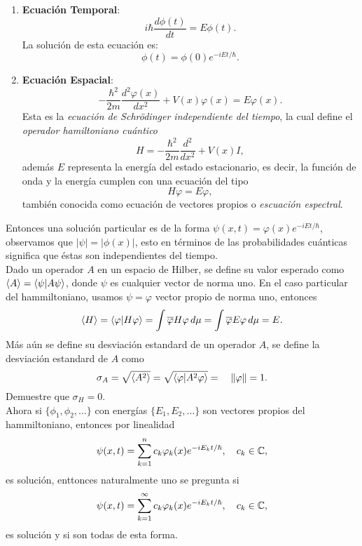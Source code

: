 \documentclass[main.tex]{subfiles}
\begin{document}
\begin{enumerate}
    \item \textbf{Ecuación Temporal}:
    \[
    i\hbar \frac{d \phi(t)}{dt} = E \phi(t).
    \]
    La solución de esta ecuación es:
    \[
    \phi(t) = \phi(0) e^{-iEt/\hbar}.
    \]

    \item \textbf{Ecuación Espacial}:
    \[
    -\frac{\hbar^2}{2m} \frac{d^2 \varphi(x)}{dx^2} + V(x) \varphi(x) = E \varphi(x).
    \]
    Esta es la \emph{ecuación de Schrödinger independiente del tiempo}, la cual define el \emph{operador hamiltoniano cuántico}
    \[
    H =-\frac{\hbar^2}{2m} \frac{d^2 }{dx^2} + V(x)I,
    \]
    además \(E\) representa la energía del estado estacionario, es decir, la función de onda y la energía cumplen con una ecuación del tipo
    \[
    H\varphi=E\varphi,
    \]
    también conocida como ecuación de vectores propios o \emph{escuación espectral}.
\end{enumerate}

Entonces una solución particular es de la forma \(\psi(x,t)=\varphi(x)e^{-iEt/\hbar}\), observamos que \(|\psi|=|\phi(x)|\), esto en términos de las probabilidades cuánticas significa que éstas son independientes del tiempo.\\
\obs Dado un operador \(A\) en un espacio de Hilber, se define su valor esperado como \(\braket{A}=\braket{\psi| A \psi}\), donde \(\psi\) es cualquier vector de norma uno. En el caso particular del hammiltoniano, usamos \(\psi=\varphi\) vector propio de norma uno, entonces
\[
    \braket{H}=\braket{\varphi|H\varphi}=\int\overline{\varphi}H\varphi\,d\mu=\int\overline{\varphi}E\varphi\,d\mu=E.
\]
\noindent Más aún se define su desviación estandard de un operador \(A\), se define la desviación estandard de \(A\) como
\[
    \sigma_A=\sqrt{\braket{A^2}}=\sqrt{\braket{\varphi|A^2\varphi}}=\quad\|\varphi\|=1.
\]
\exe Demuestre que \(\sigma_H=0\).\\
Ahora si \(\{\phi_1,\phi_2,\dots\}\) con energías \(\{E_1,E_2,\dots\}\) son vectores propios del hammiltoniano, entonces por linealidad
\[
\psi(x,t)=\sum_{k=1}^nc_k\varphi_k(x)e^{-iE_kt/\hbar},\quad c_k\in\mathbb C ,
\]
es solución, enttonces naturalmente uno se pregunta si
\[
\psi(x,t)=\sum_{k=1}^{\infty}c_k\varphi_k(x)e^{-iE_kt/\hbar},\quad c_k\in\mathbb C ,
\]
es solución y si son todas de esta forma.
\end{document}
